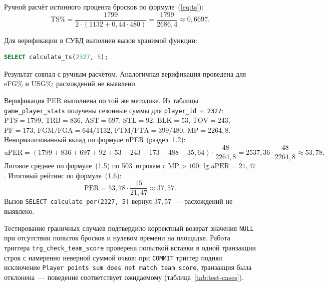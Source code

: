 Ручной расчёт истинного процента бросков по формуле~(\ref{eq:ts}):
\[
\mathrm{TS\%} = \frac{1799}{2 \cdot (1132 + 0{,}44 \cdot 480)}
  = \frac{1799}{2686{,}4} \approx 0{,}6697.
\]

Для верификации в СУБД выполнен вызов хранимой функции:
\begin{lstlisting}[language=SQL]
SELECT calculate_ts(2327, 5);
\end{lstlisting}

Результат совпал с ручным расчётом. Аналогичная верификация проведена для
eFG\% и USG\%; расхождений не выявлено.

Верификация PER выполнена по той же методике. Из таблицы
\texttt{game\_player\_stats} получены сезонные суммы для
\texttt{player\_id = 2327}: $\mathrm{PTS} = 1799$, $\mathrm{TRB} = 836$,
$\mathrm{AST} = 697$, $\mathrm{STL} = 92$, $\mathrm{BLK} = 53$,
$\mathrm{TOV} = 243$, $\mathrm{PF} = 173$, $\mathrm{FGM/FGA} = 644/1132$,
$\mathrm{FTM/FTA} = 399/480$, $\mathrm{MP} = 2264{,}8$.
Ненормализованный вклад по формуле uPER (раздел~1.2):
\[
\mathrm{uPER} =
(1799 + 836 + 697 + 92 + 53 - 243 - 173 - 488 - 35{,}64)
\cdot \frac{48}{2264{,}8} = 2537{,}36 \cdot \frac{48}{2264{,}8}
\approx 53{,}78.
\]
Лиговое среднее по формуле~(1.5) по 503~игрокам с $\mathrm{MP} > 100$:
$\mathrm{lg\_aPER} = 21{,}47$. Итоговый рейтинг по формуле~(1.6):
\[
\mathrm{PER} = 53{,}78 \cdot \frac{15}{21{,}47} \approx 37{,}57.
\]
Вызов \texttt{SELECT calculate\_per(2327, 5)} вернул $37{,}57$~---
расхождений не выявлено.

Тестирование граничных случаев подтвердило корректный возврат значения
\texttt{NULL} при отсутствии попыток бросков и нулевом времени на площадке.
Работа триггера \newline\texttt{trg\_check\_team\_score} проверена попыткой вставки
в одной транзакции строк с намеренно неверной суммой очков: при
\texttt{COMMIT} триггер поднял исключение
\texttt{Player points sum does not match team score}, транзакция была
отклонена~--- поведение соответствует ожидаемому
(таблица~\ref{tab:test-cases}).

